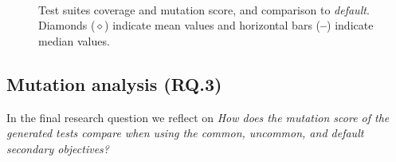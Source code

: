 \begin{figure}[t]
    \centering
    \hfill
    \\ 
   
    \caption{Test suites coverage and mutation score, and comparison to \textit{default}. Diamonds ($\diamond$) indicate mean values and horizontal bars (\textbf{--}) indicate median values.}
    \label{fig:rq2}
\end{figure}

\subsection{Mutation analysis (RQ.3)}

In the final research question we reflect on \emph{How does the \emph{mutation score} of the generated tests  compare when using the \textit{common}, \textit{uncommon}, and \textit{default} secondary objectives? }

